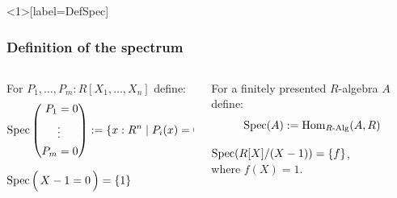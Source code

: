 \documentclass[aspectratio=1610]{beamer}
\begin{document}
\begin{frame}<1>[label=DefSpec]
  \frametitle{Definition of the spectrum}

  \begin{columns}
    \begin{column}{0.5\textwidth}
      \begin{definition}[preliminary]
        For $P_1, \dots, P_m : R[X_1, \dots, X_n]$ define:
        \[
          \operatorname{Spec}\left(\begin{aligned}
            P_1 &= 0\\
            &\vdots\\
            P_m &= 0\\
          \end{aligned}\right)
          :=
          \{x : R^n \mid P_i(x) = 0\}
        \]
      \end{definition}
      \begin{example}
        $\operatorname{Spec}\Big(\,X - 1 = 0\,\Big) = \{1\}$
      \end{example}
    \end{column}

    \pause%
    \begin{column}{0.5\textwidth}
      \begin{definition}
        For a finitely presented $R$-algebra $A$ define:
        \[ \operatorname{Spec}(A) := \mathrm{Hom}_{R\text{-}\mathrm{Alg}}(A, R) \]
      \end{definition}
      \begin{example}
        $\operatorname{Spec}(R[X]/(X - 1)) = \{f\}$,\\
        where $f(X) = 1$.
      \end{example}
    \end{column}
  \end{columns}
\end{frame}
\end{document}
